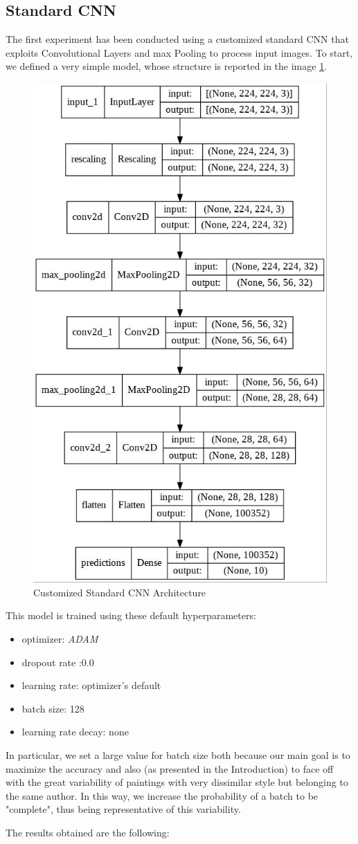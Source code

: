 \subsection{Standard CNN}
The first experiment has been conducted using a customized standard CNN that exploits Convolutional Layers and max Pooling to process input images. To start, we defined a very simple model, whose structure is reported in the image \ref{fig:standardCNN}. 
\begin{figure}[H]
	\centering
	\includegraphics[height=0.6\textwidth]{img/scratch/standardCNN.jpg}
	\caption{Customized Standard CNN Architecture}
	\label{fig:standardCNN}
\end{figure}

\noindent This model is trained using these default hyperparameters:
\begin{itemize}
\item optimizer: \textit{ADAM}
\item dropout rate :0.0
\item learning rate: optimizer's default
\item batch size: 128
\item learning rate decay: none
\end{itemize}

\noindent In particular, we set a large value for batch size both because our main goal is to maximize the accuracy and also (as presented in the Introduction) to face off with the great variability of paintings with very dissimilar style but belonging to the same author. In this way, we increase the probability of a batch to be "complete", thus being representative of this variability.

\noindent The results obtained are the following:

